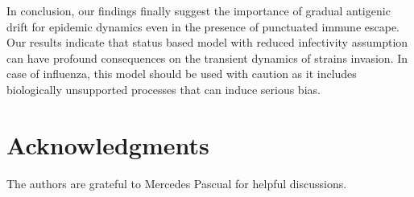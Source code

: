 \vspace{1cm}


In conclusion, our findings finally suggest the importance of gradual
antigenic drift for epidemic dynamics even in the presence of
punctuated immune escape. Our results indicate that status based model
with reduced infectivity assumption can have profound consequences on
the transient dynamics of strains invasion. In case of influenza, this
model should be used with caution as it includes biologically
unsupported processes that can induce serious bias.


\section{Acknowledgments}

The authors are grateful to Mercedes Pascual for helpful discussions.




